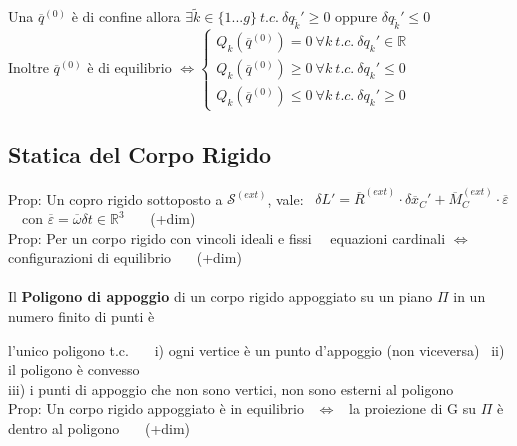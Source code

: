 \documentclass{article}
\begin{document}
\phantom{Prop: }Una $\overline{q}^{(0)}$ è di confine allora $\exists \tilde{k} \in \{1...g\} \ t.c. \ \delta q_{\tilde{k}}'\geq 0$ oppure $\delta q_{\tilde{k}}'\leq 0$ \\
\phantom{Prop: }Inoltre $\overline{q}^{(0)}$ è di equilibrio $\Leftrightarrow \begin{cases}
Q_k(\overline{q}^{(0)})=0 \ \forall k \ t.c. \ \delta q_k' \in \mathbb{R} \\
Q_k(\overline{q}^{(0)})\geq 0 \ \forall k \ t.c. \ \delta q_k' \leq 0 \\
Q_k(\overline{q}^{(0)})\leq 0 \ \forall k \ t.c. \ \delta q_k' \geq 0
\end{cases}$ 



\subsection{Statica del Corpo Rigido}
%
Prop: Un copro rigido sottoposto a $\mathcal{S}^{(ext)}$, vale: \  $\delta L' = \overline{R}^{(ext)}\cdot\delta\overline{x}_C' + \overline{M}_C^{(ext)}\cdot\overline{\varepsilon} $ \ \ con $\overline{\varepsilon}=\overline{\omega}\delta t \in \mathbb{R}^3$ \ \ \ (+dim)\\
Prop: Per un corpo rigido con vincoli ideali e fissi \ \ equazioni cardinali $\Leftrightarrow$ configurazioni di equilibrio \ \ \ (+dim)\\ \\
%
%
%
Il \textbf{Poligono di appoggio} di un corpo rigido appoggiato su un piano $\Pi$ in un numero finito di punti è

l'unico poligono t.c. \ \ \ i) ogni vertice è un punto d'appoggio (non viceversa) \ ii) il poligono è convesso  \\
\phantom{} \hspace{1.51in} iii) i punti di appoggio che non sono vertici, non sono esterni al poligono \\
%
Prop: Un corpo rigido appoggiato è in equilibrio \ $\Leftrightarrow$ \ la proiezione di G su $\Pi$ è dentro al poligono \ \ \ (+dim)\\
%
%
\newpage
\end{document}
